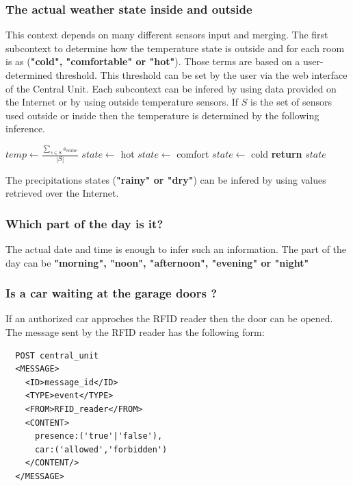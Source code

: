 \documentclass{acm_proc_article-sp}
\begin{document}
 \subsubsection*{The actual weather state inside and outside}
 This context depends on many different sensors input and merging.
 The first subcontext to determine how the temperature state is outside and for each room is as (\textbf{"cold", "comfortable" or "hot"}). 
 Those terms are based on a user-determined threshold. This threshold can be set by the user via the web interface of the Central Unit.
 Each subcontext can be infered by using data provided on the Internet or by using outside temperature sensors.
 If $S$ is the set of sensors used outside or inside then the temperature is determined by the following inference.
 \begin{description}
 \begin{algorithm}
  \begin{algorithmic}
  \State $temp\gets \frac{\underset{s \in S}{\sum} s_{value}}{|S|}$
    \State $state\gets$ hot
    \State $state\gets$ comfort
    \State $state\gets$ cold
   \EndIf
  \State \textbf{return} $state$
  \end{algorithmic}
  \end{algorithm}
  \end{description}
 The precipitations states (\textbf{"rainy" or "dry"}) can be infered by using values retrieved over the Internet.
  \subsubsection*{Which part of the day is it?}
  The actual date and time is enough to infer such an information.
  The part of the day can be \textbf{"morning", "noon", "afternoon", "evening" or "night"}
 \subsubsection*{Is a car waiting at the garage doors ?}
 If an authorized car approches the RFID reader then the door can be opened.
 The message sent by the RFID reader has the following form:
 
  \begin{minipage}{\linewidth}
\begin{lstlisting}
  POST central_unit 
  <MESSAGE>
    <ID>message_id</ID>
    <TYPE>event</TYPE>
    <FROM>RFID_reader</FROM>
    <CONTENT>
      presence:('true'|'false'),
      car:('allowed','forbidden')
    </CONTENT/>
  </MESSAGE> 
\end{lstlisting}
\end{minipage}
\end{document}
